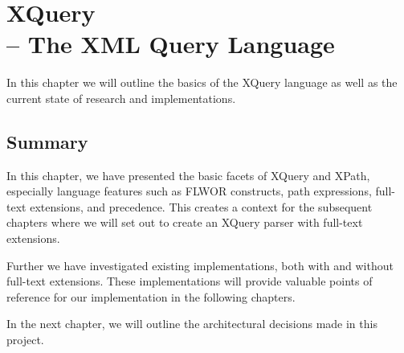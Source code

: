 \chapter[XQuery -- The XML Query Language]{XQuery \\ \huge-- The XML Query Language}
\label{chapter:theory}
In this chapter we will outline the basics of the XQuery language as well as the
current state of research and implementations. 




\section{Summary}
In this chapter, we have presented the basic facets of XQuery and XPath,
especially language features such as FLWOR constructs, path expressions, 
full-text extensions, and precedence. This creates a context for the subsequent
chapters where we will set out to create an XQuery parser with full-text
extensions. 

Further we have investigated existing implementations, both with and without
full-text extensions. These implementations will provide valuable points of
reference for our implementation in the following chapters.

In the next chapter, we will outline the architectural decisions made in this
project.